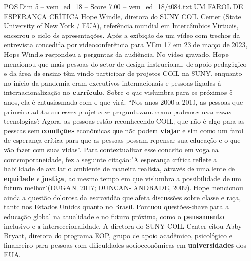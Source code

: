 \begin{textsample}{POS Dim 5 – vem\_ed\_18 – Score 7.00 – vem\_ed\_18/t084.txt}  \label{ex:f5_pos_040}
UM FAROL DE ESPERANÇA CRÍTICA Hope Windle, diretora do SUNY COIL Center (State University of New York / EUA), referência mundial em Intercâmbios Virtuais, encerrou o ciclo de apresentações.
Após a exibição de um vídeo com trechos da entrevista concedida por videoconferência para VEm 17 em 23 de março de 2023, Hope Windle respondeu a perguntas da audiência.
No vídeo gravado, Hope mencionou que mais pessoas do setor de design instrucional, de apoio pedagógico e da área de ensino têm vindo participar de projetos COIL na SUNY, enquanto no início da pandemia eram executivos internacionais e pessoas ligadas à internacionalização no \textbf{currículo}.
Sobre o que vislumbra para os próximos 5 anos, ela é entusiasmada com o que virá. “Nos anos 2000 a 2010, as pessoas que primeiro adotaram esses projetos se perguntavam: como podemos usar essas tecnologias?
Agora, as pessoas estão reconhecendo COIL, que não é algo para as pessoas sem \textbf{condições} econômicas que não podem \textbf{viajar} e sim como um farol de esperança crítica para que as pessoas possam repensar sua educação e o que vão fazer com suas vidas”.
Para contextualizar esse conceito em voga na contemporaneidade, fez a seguinte citação:"A esperança crítica reflete a habilidade de avaliar o ambiente de maneira realista, através de uma lente de \textbf{equidade} e \textbf{justiça}, ao mesmo tempo em que vislumbra a possibilidade de um futuro melhor"(DUGAN, 2017; DUNCAN- ANDRADE, 2009).
Hope mencionou ainda a questão dolorosa da escravidão que afeta discussões sobre classe e raça, tanto nos Estados Unidos quanto no Brasil.
Pontuou questões-chave para a educação global na atualidade e no futuro próximo, como o \textbf{pensamento} inclusivo e a interseccionalidade.
A diretora do SUNY COIL Center citou Abby Bryant, diretora do programa EOP, grupo de apoio acadêmico, psicológico e financeiro para pessoas com dificuldades socioeconômicas em \textbf{universidades} dos EUA.

\end{textsample}
